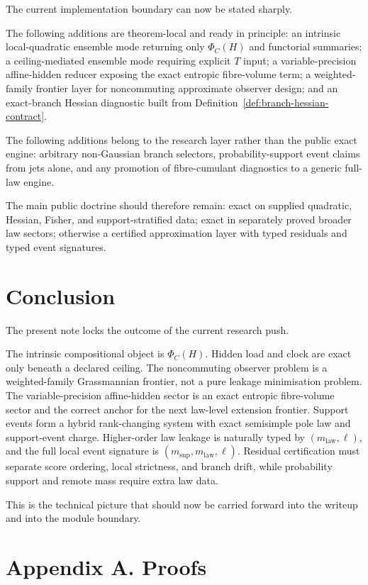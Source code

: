 \documentclass[11pt,a4paper]{article}
\numberwithin{equation}{section}
\theoremstyle{thmcompact}
\theoremstyle{remark}
\begin{document}
The current implementation boundary can now be stated sharply.

The following additions are theorem-local and ready in principle: an intrinsic local-quadratic ensemble mode returning only $\Phi_C(H)$ and functorial summaries; a ceiling-mediated ensemble mode requiring explicit $T$ input; a variable-precision affine-hidden reducer exposing the exact entropic fibre-volume term; a weighted-family frontier layer for noncommuting approximate observer design; and an exact-branch Hessian diagnostic built from Definition~\ref{def:branch-hessian-contract}.

The following additions belong to the research layer rather than the public exact engine: arbitrary non-Gaussian branch selectors, probability-support event claims from jets alone, and any promotion of fibre-cumulant diagnostics to a generic full-law engine.

The main public doctrine should therefore remain: exact on supplied quadratic, Hessian, Fisher, and support-stratified data; exact in separately proved broader law sectors; otherwise a certified approximation layer with typed residuals and typed event signatures.

\section{Conclusion}

The present note locks the outcome of the current research push.

The intrinsic compositional object is $\Phi_C(H)$. Hidden load and clock are exact only beneath a declared ceiling. The noncommuting observer problem is a weighted-family Grassmannian frontier, not a pure leakage minimisation problem. The variable-precision affine-hidden sector is an exact entropic fibre-volume sector and the correct anchor for the next law-level extension frontier. Support events form a hybrid rank-changing system with exact semisimple pole law and support-event charge. Higher-order law leakage is naturally typed by $(m_{\mathrm{law}},\ell)$, and the full local event signature is $(m_{\mathrm{sup}},m_{\mathrm{law}},\ell)$. Residual certification must separate score ordering, local strictness, and branch drift, while probability support and remote mass require extra law data.

This is the technical picture that should now be carried forward into the writeup and into the module boundary.

\appendix
\section*{Appendix A. Proofs}
\end{document}
